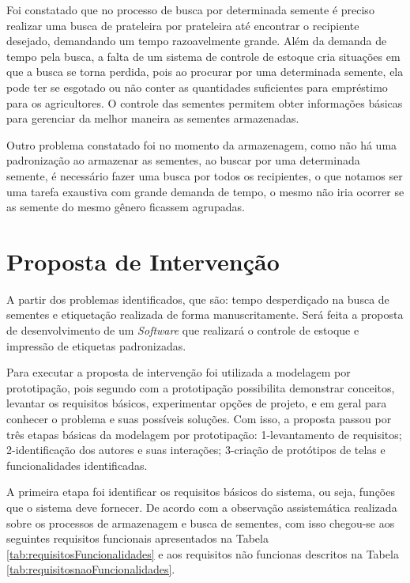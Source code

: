 \documentclass[12pt,a4paper]{article}
\begin{document}
Foi constatado que no processo de busca por determinada semente é preciso realizar uma busca de prateleira por prateleira até encontrar o recipiente desejado, demandando um tempo razoavelmente grande. Além da demanda de tempo pela busca, a falta de um sistema de controle de estoque cria situações em que a busca se torna perdida, pois ao procurar por uma determinada semente, ela pode ter se esgotado ou não conter as quantidades suficientes para empréstimo para os agricultores. O controle das sementes permitem obter informações básicas para gerenciar da melhor maneira as sementes armazenadas.

Outro problema constatado foi no momento da  armazenagem, como não há uma padronização ao armazenar as sementes, ao buscar por uma determinada semente, é necessário fazer uma busca por todos os recipientes, o que notamos ser uma tarefa exaustiva com grande demanda de tempo, o mesmo não iria ocorrer se as semente do mesmo gênero ficassem agrupadas.


\section{Proposta de Intervenção}
A partir dos problemas identificados, que são: tempo desperdiçado na busca de sementes  e etiquetação realizada de forma  manuscritamente. Será feita a proposta de desenvolvimento de um {\it Software} que realizará o controle de estoque e  impressão de etiquetas padronizadas.

Para executar a proposta de intervenção foi utilizada a modelagem por prototipação, pois segundo \cite{sommerville} com a prototipação possibilita demonstrar conceitos, levantar os requisitos básicos, experimentar opções de projeto, e em geral para conhecer o problema e suas possíveis soluções. Com isso, a proposta passou por três etapas básicas da modelagem por prototipação: 1-levantamento de requisitos; 2-identificação dos autores e suas interações; 3-criação de protótipos de telas e funcionalidades identificadas.

A primeira etapa foi identificar os requisitos básicos do sistema, ou seja, funções que o sistema deve
fornecer. De acordo com a observação assistemática realizada sobre os processos de armazenagem e busca de sementes,  com isso chegou-se aos seguintes requisitos funcionais apresentados na Tabela \ref{tab:requisitosFuncionalidades} e aos requisitos não funcionas descritos na Tabela \ref{tab:requisitosnaoFuncionalidades}.
\end{document}
